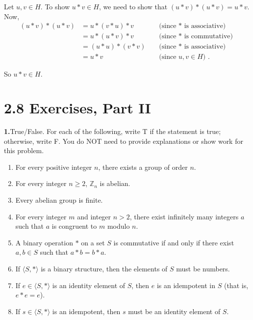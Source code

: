 \documentclass[10pt,]{book}
\theoremstyle{plain}
\theoremstyle{definition}
\theoremstyle{definition}
\theoremstyle{definition}
\theoremstyle{definition}
\numberwithin{equation}{section}
\def\Z{\mathbb{Z}}
\newcommand{\amp}{&}
\begin{document}
\par\smallskip
Let \(u,v\in H\). To show \(u*v\in H\), we need to show that \((u*v)*(u*v)=u*v\). Now,%
\begin{align*}
(u*v)*(u*v)\amp =u*(v*u)*v \amp \amp \text{ (since \(*\) is associative) }\\
\amp =u*(u*v)*v \amp \amp \text{ (since \(*\) is commutative) }\\
\amp =(u*u)*(v*v) \amp \amp \text{ (since \(*\) is associative) }\\
\amp =u*v \amp \amp \text{ (since \(u,v\in H\)) } .
\end{align*}
%
\par
So \(u*v\in H\).%
\par\smallskip
\section*{2.8 Exercises, Part II}
\noindent\textbf{1.}\quad{}True/False. For each of the following, write T if the statement is true; otherwise, write F. You do NOT need to provide explanations or show work for this problem. \leavevmode%
\begin{enumerate}[label=(\alph*)]
\item\hypertarget{li-89}{}For every positive integer \(n\), there exists a group of order \(n\).%
\item\hypertarget{li-90}{}For every integer \(n\geq 2\), \(\Z_n\) is abelian.%
\item\hypertarget{li-91}{}Every abelian group is finite.%
\item\hypertarget{li-92}{}For every integer \(m\) and integer \(n>2\), there exist infinitely many integers \(a\) such that \(a\) is congruent to \(m\) modulo \(n\).%
\item\hypertarget{li-93}{}A binary operation \(*\) on a set \(S\) is commutative if and only if there exist \(a,b\in S\) such that \(a*b=b*a\).%
\item\hypertarget{li-94}{}If \(\langle S, *\rangle\) is a binary structure, then the elements of \(S\) must be numbers.%
\item\hypertarget{li-95}{}If \(e\in \langle S,*\rangle\) is an identity element of \(S\), then \(e\) is an idempotent in \(S\) (that is, \(e*e=e\)).%
\item\hypertarget{li-96}{}If \(s\in \langle S,*\rangle\) is an idempotent, then \(s\) must be an identity element of \(S\).%
\end{enumerate}
%
\par\smallskip
\end{document}
